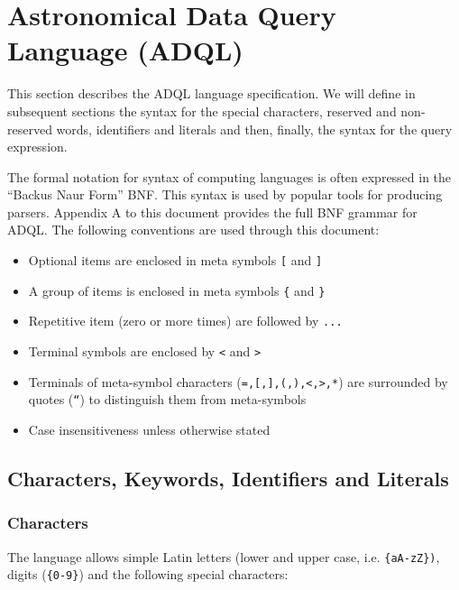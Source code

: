 \documentclass[11pt,a4paper]{ivoa}
\begin{document}
\clearpage
\section{Astronomical Data Query Language (ADQL)}
\label{sec:language}

This section describes the ADQL language specification. We will define in
subsequent sections the syntax for the special characters, reserved and non-
reserved words, identifiers and literals and then, finally, the syntax for
the query expression.

The formal notation for syntax of computing languages is often expressed
in the “Backus Naur Form” BNF. This syntax is used by popular tools for
producing parsers. Appendix A to this document provides the full BNF grammar
for ADQL. The following conventions are used through this document:

\begin{itemize}
    \item Optional items are enclosed in meta symbols \verb:[: and \verb:]:
    \item A group of items is enclosed in meta symbols \verb:{: and \verb:}:
    \item Repetitive item (zero or more times) are followed by \verb:...:
    \item Terminal symbols are enclosed by \verb:<: and \verb:>:
    \item Terminals of meta-symbol characters (\verb:=,[,],(,),<,>,*:) are surrounded by quotes (\verb:“:) to distinguish them from meta-symbols
    \item Case insensitiveness unless otherwise stated
\end{itemize}

\clearpage
\subsection{Characters, Keywords, Identifiers and Literals}
\subsubsection{Characters}
\label{sec:characters}

The language allows simple Latin letters (lower and upper case, i.e.
\verb:{aA-zZ}):, digits (\verb:{0-9}:) and the following special characters:
\end{document}
